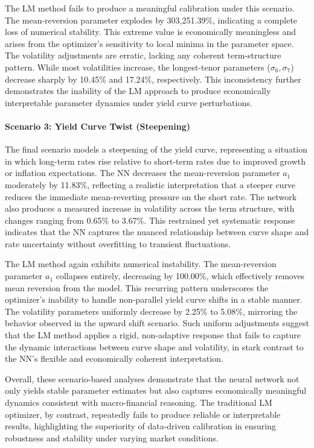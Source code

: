 The LM method fails to produce a meaningful calibration under this scenario. The mean-reversion parameter explodes by 303,251.39\%, indicating a complete loss of numerical stability. This extreme value is economically meaningless and arises from the optimizer’s sensitivity to local minima in the parameter space. The volatility adjustments are erratic, lacking any coherent term-structure pattern. While most volatilities increase, the longest-tenor parameters (\( \sigma_6, \sigma_7 \)) decrease sharply by 10.45\% and 17.24\%, respectively. This inconsistency further demonstrates the inability of the LM approach to produce economically interpretable parameter dynamics under yield curve perturbations.

\paragraph{Scenario 3: Yield Curve Twist (Steepening)}
The final scenario models a steepening of the yield curve, representing a situation in which long-term rates rise relative to short-term rates due to improved growth or inflation expectations. The NN decreases the mean-reversion parameter \( a_1 \) moderately by 11.83\%, reflecting a realistic interpretation that a steeper curve reduces the immediate mean-reverting pressure on the short rate. The network also produces a measured increase in volatility across the term structure, with changes ranging from 0.65\% to 3.67\%. This restrained yet systematic response indicates that the NN captures the nuanced relationship between curve shape and rate uncertainty without overfitting to transient fluctuations.

The LM method again exhibits numerical instability. The mean-reversion parameter \( a_1 \) collapses entirely, decreasing by 100.00\%, which effectively removes mean reversion from the model. This recurring pattern underscores the optimizer’s inability to handle non-parallel yield curve shifts in a stable manner. The volatility parameters uniformly decrease by 2.25\% to 5.08\%, mirroring the behavior observed in the upward shift scenario. Such uniform adjustments suggest that the LM method applies a rigid, non-adaptive response that fails to capture the dynamic interactions between curve shape and volatility, in stark contrast to the NN’s flexible and economically coherent interpretation.

Overall, these scenario-based analyses demonstrate that the neural network not only yields stable parameter estimates but also captures economically meaningful dynamics consistent with macro-financial reasoning. The traditional LM optimizer, by contrast, repeatedly fails to produce reliable or interpretable results, highlighting the superiority of data-driven calibration in ensuring robustness and stability under varying market conditions.

